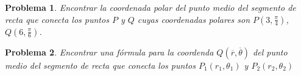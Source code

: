 \documentclass[letterpaper,12pt]{article}
\newtheorem{prob}{Problema}
\begin{document}
\begin{prob}
Encontrar la coordenada polar del punto medio del segmento de recta que conecta los puntos $P$ y $Q$ cuyas coordenadas polares son $\displaystyle P\left(3,\frac{\pi}{4}\right)$, $\displaystyle Q\left(6,\frac{\pi}{6}\right)$.
\end{prob}

\begin{prob}
Encontrar una fórmula para la coordenda $\displaystyle Q\left(\overline{r},\overline{\theta}\right)$ del punto medio del segmento de recta que conecta los puntos $P_1\left(r_1,\theta_1\right)$ y $P_2\left(r_2,\theta_2\right)$
\end{prob}
\end{document}
